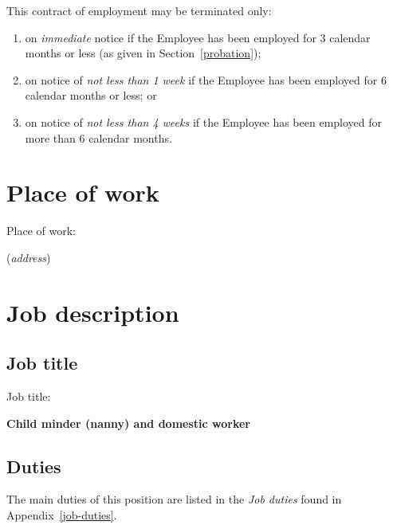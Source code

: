 \documentclass[a4paper,11pt]{article}
\begin{document}
\para This contract of employment may be terminated only:

\begin{enumerate}

  \item on \textit{immediate} notice if the Employee has been employed for 3 calendar
    months or less (as given in Section~\ref{probation});

  \item on notice of \textit{not less than 1 week} if the Employee has been
    employed for 6 calendar months or less; or

  \item on notice of \textit{not less than 4 weeks} if the Employee has been
    employed for more than 6 calendar months.

\end{enumerate}

\section{Place of work}

\para Place of work:

\begin{center}


  (\textit{address})
\end{center}

\section{Job description}

\subsection{Job title}
\label{job-title}

\para Job title:

\begin{center}
   \textbf{Child minder (nanny) and domestic worker}
\end{center}

\subsection{Duties}
\label{duties}

\para The main duties of this position are listed in the \textit{Job duties}
found in Appendix~\ref{job-duties}.
\end{document}
